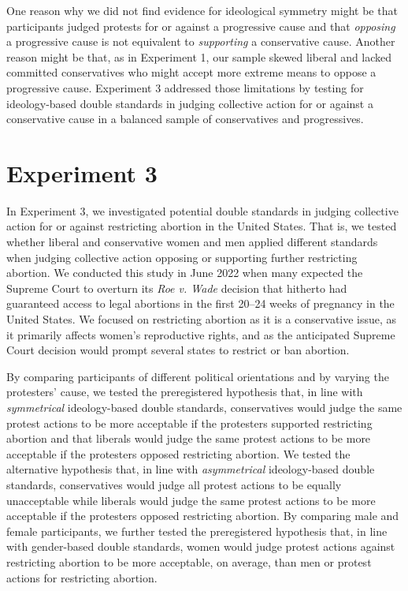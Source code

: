 \documentclass[12pt, letterpaper]{article}
\begin{document}
One reason why we did not find evidence for ideological symmetry might
be that participants judged protests for or against a progressive cause
and that \emph{opposing} a progressive cause is not equivalent to
\emph{supporting} a conservative cause. Another reason might be that, as
in Experiment 1, our sample skewed liberal and lacked committed
conservatives who might accept more extreme means to oppose a
progressive cause. Experiment 3 addressed those limitations by testing
for ideology-based double standards in judging collective action for or
against a conservative cause in a balanced sample of conservatives and
progressives.

\hypertarget{experiment-3}{%
\section{Experiment 3}\label{experiment-3}}

In Experiment 3, we investigated potential double standards in judging
collective action for or against restricting abortion in the United
States. That is, we tested whether liberal and conservative women and
men applied different standards when judging collective action opposing
or supporting further restricting abortion. We conducted this study in
June 2022 when many expected the Supreme Court to overturn its \emph{Roe
v. Wade} decision that hitherto had guaranteed access to legal abortions
in the first 20--24 weeks of pregnancy in the United States. We focused
on restricting abortion as it is a conservative issue, as it primarily
affects women's reproductive rights, and as the anticipated Supreme
Court decision would prompt several states to restrict or ban abortion.

By comparing participants of different political orientations and by
varying the protesters' cause, we tested the preregistered hypothesis
that, in line with \emph{symmetrical} ideology-based double standards,
conservatives would judge the same protest actions to be more acceptable
if the protesters supported restricting abortion and that liberals would
judge the same protest actions to be more acceptable if the protesters
opposed restricting abortion. We tested the alternative hypothesis that,
in line with \emph{asymmetrical} ideology-based double standards,
conservatives would judge all protest actions to be equally unacceptable
while liberals would judge the same protest actions to be more
acceptable if the protesters opposed restricting abortion. By comparing
male and female participants, we further tested the preregistered
hypothesis that, in line with gender-based double standards, women would
judge protest actions against restricting abortion to be more
acceptable, on average, than men or protest actions for restricting
abortion.
\end{document}

